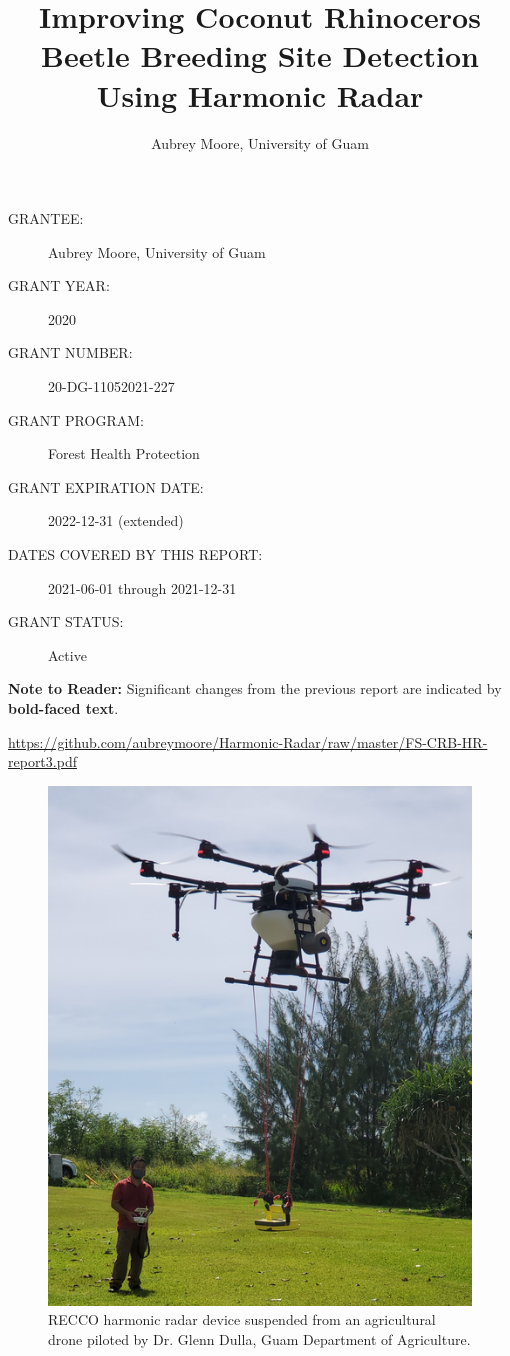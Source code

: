 \documentclass[12pt,letterpaper,english,bibliography=totocnumbered,abstract=on]{scrartcl}
\begin{document}
\titlehead{US Forest Service Forest Health Protetion Grant Progess Report 3}
\title{Improving Coconut Rhinoceros Beetle Breeding Site Detection Using Harmonic Radar}
\author{Aubrey Moore, University of Guam}
\maketitle
\begin{description}	
	\item[GRANTEE:] Aubrey Moore, University of Guam 
	\item[GRANT YEAR:] 2020
	\item[GRANT NUMBER:] 20-DG-11052021-227
	\item[GRANT PROGRAM:] Forest Health Protection
	\item[GRANT EXPIRATION DATE:] 2022-12-31 (extended)
	\item[DATES COVERED BY THIS REPORT:] 2021-06-01 through 2021-12-31
	\item[GRANT STATUS:] Active
\end{description}	

\textbf{Note to Reader:} Significant changes from the previous report are indicated by \textbf{bold-faced text}.

\bigskip

\begin{footnotesize}
\url{https://github.com/aubreymoore/Harmonic-Radar/raw/master/FS-CRB-HR-report3.pdf}
\end{footnotesize}


\newpage{}
\tableofcontents{}

\newpage

\begin{figure}
	\centering
	\includegraphics[width=0.7\linewidth]{drone}
	\caption{RECCO harmonic radar device suspended from an agricultural drone piloted by Dr. Glenn Dulla, Guam Department of Agriculture.}
	\label{fig:drone}
\end{figure}
\end{document}
